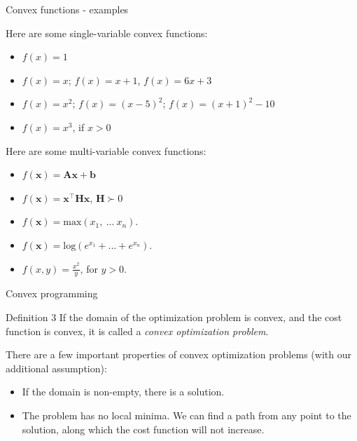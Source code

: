 \documentclass{beamer}
\begin{document}
\begin{frame}{Convex functions - examples}
	\begin{flushleft}
		
		Here are some single-variable convex functions: 
		
		\begin{itemize}
			\item $f(x) = 1$
			\item $f(x) = x$; $f(x) = x + 1$, $f(x) = 6x + 3$
			\item $f(x) = x^2$; $f(x) = (x - 5)^2$; $f(x) = (x + 1)^2 - 10$
			\item $f(x) = x^3$, if $x > 0$
		\end{itemize}
		
		\bigskip
		
		Here are some multi-variable convex functions: 
		
		\begin{itemize}
			\item $f(\mathbf{x}) = \mathbf{A}\mathbf{x} + \mathbf{b}$
			\item $f(\mathbf{x}) = \mathbf{x}^\top \mathbf{H}\mathbf{x}$, $\mathbf{H} \succ 0$ 
			
			\item $f(\mathbf{x}) = \text{max}(x_1, \ ... \ x_n) $.
			\item $f(\mathbf{x}) = \text{log}(e^{x_1}+ ... +e^{x_n}) $.
			\item $f(x, y) = \frac{x^2}{y}$, for $y > 0$.
		\end{itemize}
		
	\end{flushleft}
\end{frame}



\begin{frame}{Convex programming}
	\begin{flushleft}
		
		\begin{block}{Definition 3}
			If the domain of the optimization problem is convex, and the cost function is convex, it is called a \emph{convex optimization problem}.
		\end{block}
		
		\bigskip
		
		There are a few important properties of convex optimization problems (with our additional assumption):
		
		\begin{itemize}
			\item If the domain is non-empty, there is a solution.
			\item The problem has no local minima. We can find a path from any point to the solution, along which the cost function will not increase.
		\end{itemize}
		
	\end{flushleft}
\end{frame}
\end{document}
